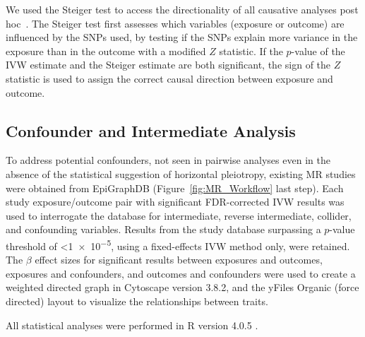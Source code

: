 \documentclass[genes,article,accept,moreauthors,pdftex]{Definitions/mdpi}
\begin{document}
We used the Steiger test to access the directionality of all causative analyses post hoc~\cite{hemani_orienting_2017}. The Steiger test first assesses which variables (exposure or outcome) are influenced by the SNPs used, by testing if the SNPs explain more variance in the exposure than in the outcome with a modified $Z$ statistic. If the $p$-value of the IVW estimate and the Steiger estimate are both significant, the sign of the $Z$ statistic is used to assign the correct causal direction between exposure and outcome.

\subsection{Confounder and Intermediate Analysis}
To address potential confounders, not seen in pairwise analyses even in the absence of the statistical suggestion of horizontal pleiotropy, existing MR studies were obtained from EpiGraphDB (Figure~\ref{fig:MR_Workflow} last step). Each study exposure/outcome pair with significant FDR-corrected IVW results was used to interrogate the database for intermediate, reverse intermediate, collider, and confounding variables. Results from the study database surpassing a $p$-value threshold of <\num{1e-5}, using a fixed-effects IVW method only, were retained. The $\beta$ effect sizes for significant results between exposures and outcomes, exposures and confounders, and outcomes and confounders were used to create a weighted directed graph in Cytoscape \cite{shannon_cytoscape_2003} version 3.8.2, and the yFiles Organic (force directed) layout to visualize the relationships between traits. 

All statistical analyses were performed in R version 4.0.5 \cite{r_core_team_r:_2013}. 


\end{document}
